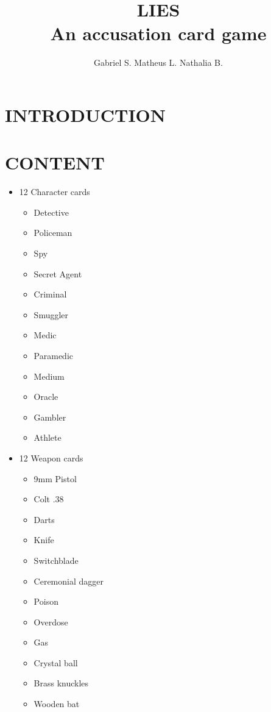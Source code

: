 \documentclass[a4paper, 11pt]{article}
\title{\textbf{LIES} \\ \small{An accusation card game}}
\author{Gabriel S. Matheus L. Nathalia B.}
\begin{document}
\maketitle

\newpage

\newpage

\section*{INTRODUCTION}


\section*{CONTENT}

	\begin{itemize}

	\item 12 Character cards
		\begin{itemize}

		\item Detective
		\item Policeman
		\item Spy
		\item Secret Agent
		\item Criminal
		\item Smuggler
		\item Medic
		\item Paramedic
		\item Medium
		\item Oracle
		\item Gambler
		\item Athlete

		\end{itemize}
		
	\item 12 Weapon cards
		\begin{itemize}

		\item 9mm Pistol
		\item Colt .38
		\item Darts
		\item Knife
		\item Switchblade
		\item Ceremonial dagger
		\item Poison
		\item Overdose
		\item Gas
		\item Crystal ball
		\item Brass knuckles
		\item Wooden bat	


\end{itemize}
\end{itemize}
\end{document}
